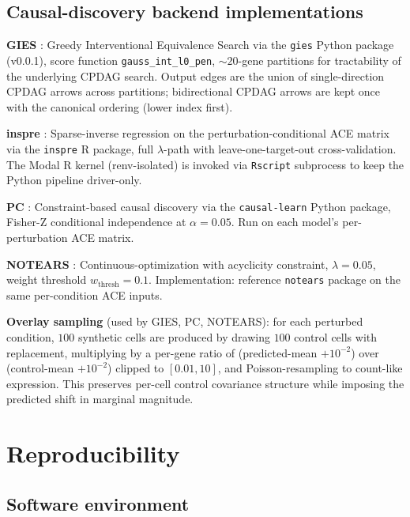 \documentclass{article}
\theoremstyle{plain}
\theoremstyle{definition}
\theoremstyle{remark}
\begin{document}
\subsection{Causal-discovery backend implementations}
\label{app:cd_backends}

\textbf{GIES} \citep{hauser2012gies}: Greedy Interventional Equivalence Search via the \texttt{gies} Python package (v0.0.1), score function \texttt{gauss\_int\_l0\_pen}, ${\sim}20$-gene partitions for tractability of the underlying CPDAG search. Output edges are the union of single-direction CPDAG arrows across partitions; bidirectional CPDAG arrows are kept once with the canonical ordering (lower index first).

\textbf{inspre} \citep{brown2025inspre}: Sparse-inverse regression on the perturbation-conditional ACE matrix via the \texttt{inspre} R package, full $\lambda$-path with leave-one-target-out cross-validation. The Modal R kernel (renv-isolated) is invoked via \texttt{Rscript} subprocess to keep the Python pipeline driver-only.

\textbf{PC} \citep{spirtes2000}: Constraint-based causal discovery via the \texttt{causal-learn} Python package, Fisher-Z conditional independence at $\alpha = 0.05$. Run on each model's per-perturbation ACE matrix.

\textbf{NOTEARS} \citep{zheng2018notears}: Continuous-optimization with acyclicity constraint, $\lambda = 0.05$, weight threshold $w_{\mathrm{thresh}} = 0.1$. Implementation: reference \texttt{notears} package on the same per-condition ACE inputs.

\textbf{Overlay sampling} (used by GIES, PC, NOTEARS): for each perturbed condition, $100$ synthetic cells are produced by drawing $100$ control cells with replacement, multiplying by a per-gene ratio of (predicted-mean $+ 10^{-2}$) over (control-mean $+ 10^{-2}$) clipped to $[0.01, 10]$, and Poisson-resampling to count-like expression. This preserves per-cell control covariance structure while imposing the predicted shift in marginal magnitude.

\section{Reproducibility}
\label{app:reproducibility}

\subsection{Software environment}
\label{app:software}
\end{document}
